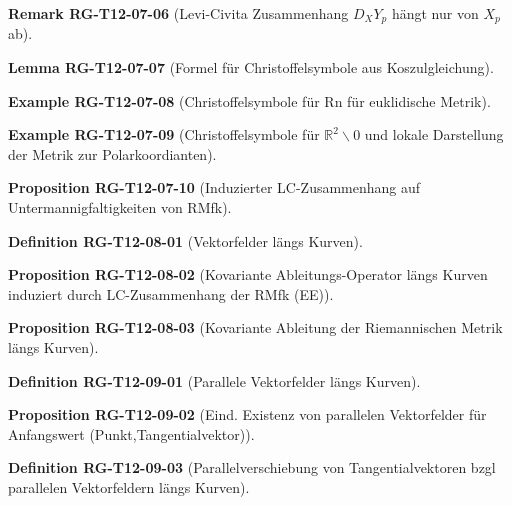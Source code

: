 \documentclass[10pt, letterpaper]{article}
\newcommand{\R}{\mathbb{R}}
\newcommand{\CustomHeading}[3]{%
  \par\medskip\noindent%
  \textbf{#1 #2} \textnormal{(#3)}.\enskip%
}
\newenvironment{DEF}[2]{\CustomHeading{Definition}{#1}{#2}}{}
\newenvironment{PROP}[2]{\CustomHeading{Proposition}{#1}{#2}}{}
\newenvironment{LEM}[2]{\CustomHeading{Lemma}{#1}{#2}}{}
\newenvironment{REM}[2]{\CustomHeading{Remark}{#1}{#2}}{}
\newenvironment{EXA}[2]{\CustomHeading{Example}{#1}{#2}}{}
\begin{document}
\begin{REM}{RG-T12-07-06}{Levi-Civita Zusammenhang $D_XY_p$ hängt nur von $X_p$ ab}
\end{REM}

\begin{LEM}{RG-T12-07-07}{Formel für Christoffelsymbole aus Koszulgleichung}
\end{LEM}

\begin{EXA}{RG-T12-07-08}{Christoffelsymbole für Rn für euklidische Metrik}
\end{EXA}

\begin{EXA}{RG-T12-07-09}{Christoffelsymbole für $\R^2\backslash 0$ und lokale Darstellung der Metrik zur Polarkoordianten}
\end{EXA}

\begin{PROP}{RG-T12-07-10}{Induzierter LC-Zusammenhang auf Untermannigfaltigkeiten von RMfk}
\end{PROP}

\begin{DEF}{RG-T12-08-01}{Vektorfelder längs Kurven}
\end{DEF}

\begin{PROP}{RG-T12-08-02}{Kovariante Ableitungs-Operator längs Kurven induziert durch LC-Zusammenhang der RMfk (EE)}
\end{PROP}

\begin{PROP}{RG-T12-08-03}{Kovariante Ableitung der Riemannischen Metrik längs Kurven}
\end{PROP}

\begin{DEF}{RG-T12-09-01}{Parallele Vektorfelder längs Kurven}
\end{DEF}

\begin{PROP}{RG-T12-09-02}{Eind. Existenz von parallelen Vektorfelder für Anfangswert (Punkt,Tangentialvektor)}
\end{PROP}

\begin{DEF}{RG-T12-09-03}{Parallelverschiebung von Tangentialvektoren bzgl parallelen Vektorfeldern längs Kurven}
\end{DEF}
\end{document}
